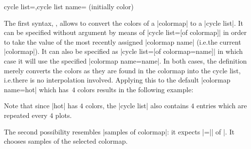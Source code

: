 \begin{pgfplotskeylist}{cycle list=,cycle list name= (initially color)}
{    The first syntax, , allows to convert the
    colors of a |colormap| to a |cycle list|. It can be specified without
    argument by means of |cycle list={[of colormap]}| in order to take the
    value of the most recently assigned |colormap name| (i.e.\@ the current
    |colormap|). It can also be specified as |cycle list={[of colormap=name]}|
    in which case it will use the specified |colormap name=name|. In both
    cases, the definition merely converts the colors as they are found in the
    colormap into the cycle list, i.e.\@ there is no interpolation involved.
    Applying this to the default |colormap name=hot| which has~$4$ colors
    results in the following example:
\begin{codeexample}[]
\end{codeexample}
    Note that since |hot| has $4$ colors, the |cycle list| also contains $4$
    entries which are repeated every $4$ plots.

    The second possibility resembles |samples of colormap|: it expects
    |=|| of |.
    It chooses  samples of the selected colormap.

}
\end{pgfplotskeylist}
